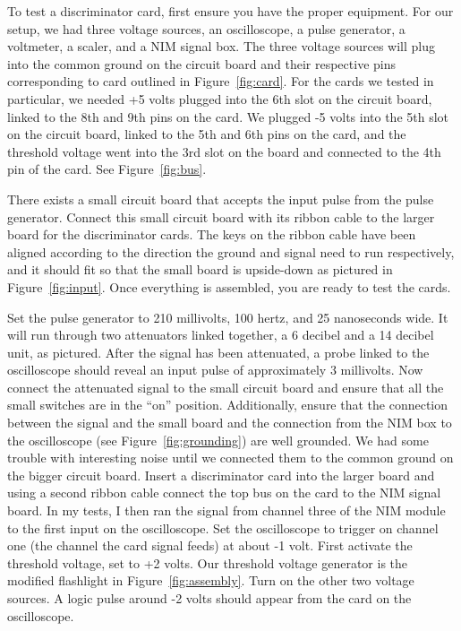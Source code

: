 \documentclass[final]{report}
\begin{document}
To test a discriminator card, first ensure you have the proper equipment. For our setup, we had three voltage sources, an oscilloscope, a pulse generator, a voltmeter, a scaler, and a NIM signal box. The three voltage sources will plug into the common ground on the circuit board and their respective pins corresponding to card outlined in Figure~\ref{fig:card}. For the cards we tested in particular, we needed +5 volts plugged into the 6th slot on the circuit board, linked to the 8th and 9th pins on the card. We plugged -5 volts into the 5th slot on the circuit board, linked to the 5th and 6th pins on the card, and the threshold voltage went into the 3rd slot on the board and connected to the 4th pin of the card. See Figure~\ref{fig:bus}. 

There exists a small circuit board that accepts the input pulse from the pulse generator. Connect this small circuit board with its ribbon cable to the larger board for the discriminator cards. The keys on the ribbon cable have been aligned according to the direction the ground and signal need to run respectively, and it should fit so that the small board is upside-down as pictured in Figure~\ref{fig:input}. Once everything is assembled, you are ready to test the cards.

Set the pulse generator to 210 millivolts, 100 hertz, and 25 nanoseconds wide. It will run through two attenuators linked together, a 6 decibel and a 14 decibel unit, as pictured. After the signal has been attenuated, a probe linked to the oscilloscope should reveal an input pulse of approximately 3 millivolts. Now connect the attenuated signal to the small circuit board and ensure that all the small switches are in the ``on'' position. Additionally, ensure that the connection between the signal and the small board and the connection from the NIM box to the oscilloscope (see Figure~\ref{fig:grounding}) are well grounded. We had some trouble with interesting noise until we connected them to the common ground on the bigger circuit board. Insert a discriminator card into the larger board and using a second ribbon cable connect the top bus on the card to the NIM signal board. In my tests, I then ran the signal from channel three of the NIM module to the first input on the oscilloscope. Set the oscilloscope to trigger on channel one (the channel the card signal feeds) at about -1 volt. First activate the threshold voltage, set to +2 volts. Our threshold voltage generator is the modified flashlight in Figure~\ref{fig:assembly}. Turn on the other two voltage sources. A logic pulse around -2 volts should appear from the card on the oscilloscope. 
\end{document}
